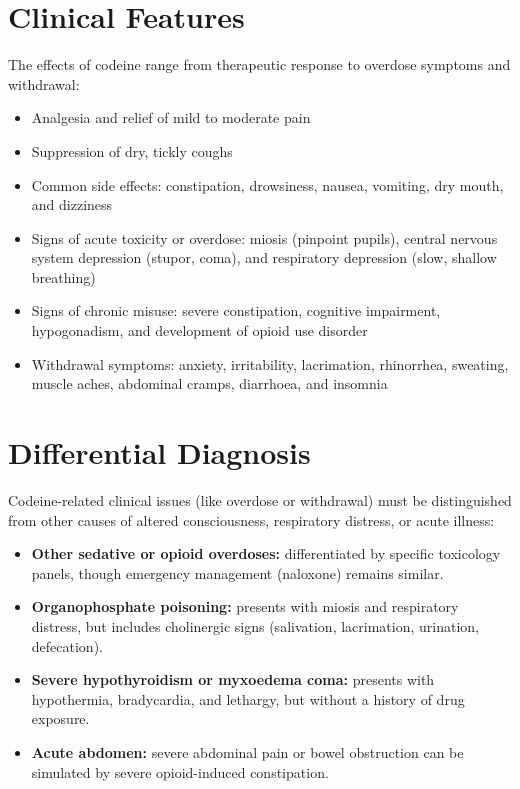 \section*{Clinical Features}
The effects of codeine range from therapeutic response to overdose symptoms and withdrawal:

\begin{itemize}
    \item Analgesia and relief of mild to moderate pain
    \item Suppression of dry, tickly coughs
    \item Common side effects: constipation, drowsiness, nausea, vomiting, dry mouth, and dizziness
    \item Signs of acute toxicity or overdose: miosis (pinpoint pupils), central nervous system depression (stupor, coma), and respiratory depression (slow, shallow breathing)
    \item Signs of chronic misuse: severe constipation, cognitive impairment, hypogonadism, and development of opioid use disorder
    \item Withdrawal symptoms: anxiety, irritability, lacrimation, rhinorrhea, sweating, muscle aches, abdominal cramps, diarrhoea, and insomnia
\end{itemize}

\section*{Differential Diagnosis}
Codeine-related clinical issues (like overdose or withdrawal) must be distinguished from other causes of altered consciousness, respiratory distress, or acute illness:

\begin{itemize}
    \item \textbf{Other sedative or opioid overdoses:} differentiated by specific toxicology panels, though emergency management (naloxone) remains similar.
    \item \textbf{Organophosphate poisoning:} presents with miosis and respiratory distress, but includes cholinergic signs (salivation, lacrimation, urination, defecation).
    \item \textbf{Severe hypothyroidism or myxoedema coma:} presents with hypothermia, bradycardia, and lethargy, but without a history of drug exposure.
    \item \textbf{Acute abdomen:} severe abdominal pain or bowel obstruction can be simulated by severe opioid-induced constipation.
\end{itemize}

